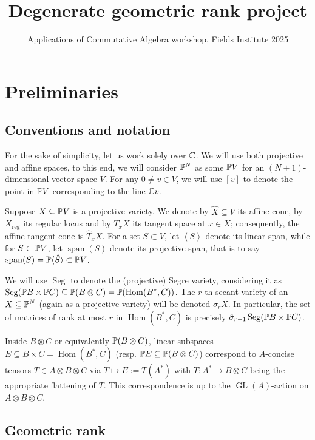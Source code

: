 \documentclass[a4paper,10pt]{article}
\title{Degenerate geometric rank project}
\author{Applications of Commutative Algebra workshop, Fields Institute 2025}
\date{}
\def\reg{\text{reg}}
\def\gener#1{\left\langle#1\right\rangle}
\DeclareMathOperator{\Hom}{Hom}\let\hom\Hom
\DeclareMathOperator{\Seg}{Seg}
\DeclareMathOperator{\GL}{GL}
\DeclareMathOperator{\spn}{span}
\theoremstyle{definition}
\theoremstyle{remark}
\begin{document}
\maketitle

\setcounter{section}{-1}
\section{Preliminaries}

\subsection{Conventions and notation}
For the sake of simplicity, let us work solely over $\ce$.
We will use both projective and affine spaces, to this end, we will consider $\pe^N$ as some $\pe V$ for an $(N+1)$-dimensional vector space $V$. For any $0\neq v\in V$, we will use $[v]$ to denote the point in $\pe V$ corresponding to the line $\ce v$.

Suppose $X\subseteq\pe V$ is a projective variety. We denote by $\hat X\subseteq V$ its affine cone, by $X_\reg$ its regular locus and by $T_xX$ its tangent space at $x\in X$; consequently, the affine tangent cone is $\hat T_x X$. For a set $S\subset V$, let $\gener S$ denote its linear span, while for $S\subset \pe V$, let $\spn(S)$ denote its projective span, that is to say $\spn(S)=\pe \langle\hat S\rangle\subset \pe V$.

We will use $\Seg$ to denote the (projective) Segre variety, considering it as $\Seg(\pe B\times\pe C)\subseteq  \pe(B\otimes C)= \pe(\Hom(B^*, C))$. The $r$-th secant variety of an $X\subseteq\pe^N$ (again as a projective variety) will be denoted $\sigma_r X$. In particular, the set of matrices of rank at most $r$ in $\Hom(B^*,C)$ is precisely $\hat\sigma_{r-1}\Seg(\pe B\times\pe C)$.

Inside $B\otimes C$ or equivalently $\pe(B\otimes C)$, linear subspaces $E\subseteq B\times C = \Hom(B^*, C)$ (resp. $\pe E\subseteq \pe(B\otimes C)$) correspond to $A$-concise tensors $T\in A\otimes B\otimes C$ via $T\mapsto E:=T(A^*)$ with $T:A^*\to B\otimes C$ being the appropriate flattening of $T$. This correspondence is up to the $\GL(A)$-action on $A\otimes B\otimes C$.

\subsection{Geometric rank}
\end{document}
